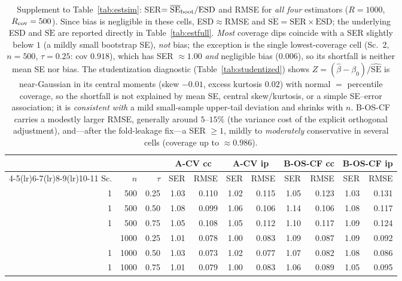 \begin{table}[t]\centering\small
\caption{Supplement to Table~\ref{tab:estsim}: SER$=\overline{\mathrm{SE}}_{\rm boot}/\mathrm{ESD}$ and RMSE for \emph{all four} estimators ($R=1000$, $R_{\rm cov}=500$). Since bias is negligible in these cells, ESD$\approx$RMSE and $\overline{\mathrm{SE}}=\mathrm{SER}\times\mathrm{ESD}$; the underlying ESD and $\overline{\mathrm{SE}}$ are reported directly in Table~\ref{tab:estfull}. \emph{Most} coverage dips coincide with a SER slightly below $1$ (a mildly small bootstrap SE), \emph{not} bias; the exception is the single lowest-coverage cell (Sc.~2, $n{=}500$, $\tau{=}0.25$: cov $0.918$), which has SER $\approx1.00$ \emph{and} negligible bias ($0.006$), so its shortfall is neither mean SE nor bias. The studentization diagnostic (Table~\ref{tab:studentized}) shows $Z=(\widehat\beta-\beta_0)/\widehat{\mathrm{SE}}$ is near-Gaussian in its central moments (skew $-0.01$, excess kurtosis $0.02$) with normal $=$ percentile coverage, so the shortfall is not explained by mean SE, central skew/kurtosis, or a simple SE--error association; it is \emph{consistent with} a mild small-sample upper-tail deviation and shrinks with $n$. B-OS-CF carries a modestly larger RMSE, generally around $5$--$15\%$ (the variance cost of the explicit orthogonal adjustment), and---after the fold-leakage fix---a SER $\ge1$, mildly to \emph{moderately} conservative in several cells (coverage up to $\approx0.986$).}
\label{tab:estse}\begin{tabular}{rrr rr rr rr rr}\toprule
&&& \multicolumn{2}{c}{A-CV cc} & \multicolumn{2}{c}{A-CV ip} & \multicolumn{2}{c}{B-OS-CF cc} & \multicolumn{2}{c}{B-OS-CF ip}\\
\cmidrule(lr){4-5}\cmidrule(lr){6-7}\cmidrule(lr){8-9}\cmidrule(lr){10-11}
Sc.&$n$&$\tau$&SER&RMSE&SER&RMSE&SER&RMSE&SER&RMSE\\\midrule
1 & 500 & 0.25 & 1.03 & 0.110 & 1.02 & 0.115 & 1.05 & 0.123 & 1.03 & 0.131 \\
1 & 500 & 0.50 & 1.08 & 0.099 & 1.06 & 0.106 & 1.14 & 0.106 & 1.08 & 0.117 \\
1 & 500 & 0.75 & 1.05 & 0.108 & 1.05 & 0.112 & 1.10 & 0.117 & 1.09 & 0.124 \\
\addlinespace
1 & 1000 & 0.25 & 1.01 & 0.078 & 1.00 & 0.083 & 1.09 & 0.087 & 1.09 & 0.092 \\
1 & 1000 & 0.50 & 1.03 & 0.073 & 1.02 & 0.077 & 1.07 & 0.082 & 1.08 & 0.086 \\
1 & 1000 & 0.75 & 1.01 & 0.079 & 1.00 & 0.083 & 1.06 & 0.089 & 1.05 & 0.095 \\

\end{tabular}
\end{table}
